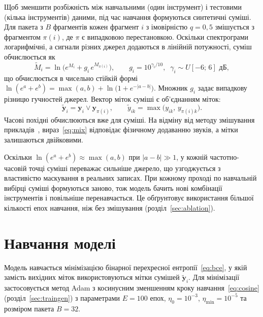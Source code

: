 Щоб зменшити розбіжність між навчальними (один інструмент) і тестовими
(кілька інструментів) даними, під час навчання формуються синтетичні
суміші. Для пакета з $B$ фрагментів кожен фрагмент $i$ з імовірністю
$q = 0{,}5$ змішується з фрагментом $\pi(i)$, де $\pi$ є випадковою
перестановкою. Оскільки спектрограми логарифмічні, а сигнали різних джерел
додаються в лінійній потужності, суміш обчислюється як
\begin{equation}
    \widetilde{M}_i = \ln\!\big( e^{M_i} + g_i\, e^{M_{\pi(i)}} \big),
    \qquad g_i = 10^{\gamma_i / 10},\;\; \gamma_i \sim U[-6;\, 6] \text{ дБ},
    \label{eq:mix}
\end{equation}
що обчислюється в чисельно стійкій формі
$\ln(e^a + e^b) = \max(a,b) + \ln\!\big(1 + e^{-|a-b|}\big)$. Множник $g_i$ задає випадкову різницю
гучностей джерел. Вектор міток суміші є об'єднанням міток:
\begin{equation}
    \widetilde{\mathbf{y}}_i = \mathbf{y}_i \vee \mathbf{y}_{\pi(i)},
    \qquad \widetilde{y}_{ik} = \max\big(y_{ik},\, y_{\pi(i)k}\big).
\end{equation}
Часові похідні обчислюються вже для суміші. На відміну від методу
змішування прикладів~\cite{zhang2018}, вираз~\eqref{eq:mix} відповідає
фізичному додаванню звуків, а мітки залишаються двійковими.

Оскільки $\ln(e^a + e^b) \approx \max(a, b)$ при $|a - b| \gg 1$, у
кожній частотно-часовій точці суміші переважає сильніше джерело, що
узгоджується з властивістю маскування в реальних записах. При кожному
проході по навчальній вибірці суміші формуються заново, тож модель
бачить нові комбінації інструментів і повільніше перенавчається. Це
обґрунтовує використання більшої кількості епох навчання, ніж без
змішування (розділ~\ref{sec:ablation}).

\section{Навчання моделі}
\label{sec:loss}

Модель навчається мінімізацією бінарної перехресної
ентропії~\eqref{eq:bce}, у якій замість вихідних міток використовуються
мітки сумішей $\widetilde{\mathbf{y}}_i$. Для мінімізації застосовується
метод Adam з косинусним зменшенням кроку навчання~\eqref{eq:cosine}
(розділ~\ref{sec:traingen}) з параметрами $E = 100$ епох,
$\eta_0 = 10^{-3}$, $\eta_{\min} = 10^{-5}$ та розміром пакета $B = 32$.

